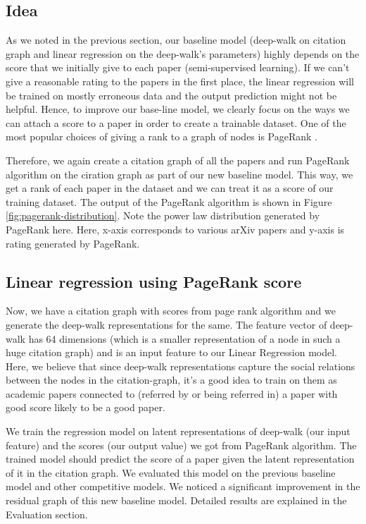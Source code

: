 \documentclass[a4paper, 11pt]{article}
\begin{document}
\subsection{Idea}
As we noted in the previous section, our baseline model (deep-walk on citation graph and linear regression on the deep-walk's parameters) highly depends on the score that we initially give to each paper (semi-supervised learning). If we can't give a reasonable rating to the papers in the first place, the linear regression will be trained on mostly erroneous data and the output prediction might not be helpful. Hence, to improve our base-line model, we clearly focus on the ways we can attach a score to a paper in order to create a trainable dataset. One of the most popular choices of giving a rank to a graph of nodes is PageRank \cite{pagerank}.

\vspace{0.5cm}

Therefore, we again create a citation graph of all the papers and run PageRank algorithm on the ciration graph as part of our new baseline model. This way, we get a rank of each paper in the dataset and we can treat it as a score of our training dataset. The output of the PageRank algorithm is shown in Figure \ref{fig:pagerank-distribution}. Note the power law distribution generated by PageRank here. Here, x-axis corresponds to various arXiv papers and y-axis is rating generated by PageRank.

\subsection{Linear regression using PageRank score}

Now, we have a citation graph with scores from page rank algorithm and we generate the deep-walk representations for the same. The feature vector of deep-walk has 64 dimensions (which is a smaller representation of a node in such a huge citation graph) and is an input feature to our Linear Regression model. Here, we believe that since deep-walk representations capture the social relations between the nodes in the citation-graph, it's a good idea to train on them as academic papers connected to (referred by or being referred in) a paper with good score likely to be a good paper. 

\vspace{0.5cm}

We train the regression model on latent representations of deep-walk (our input feature) and the scores (our output value) we got from PageRank algorithm. The trained model should predict the score of a paper given the latent representation of it in the citation graph. We evaluated this model on the previous baseline model and other competitive models. We noticed a significant improvement in the residual graph of this new baseline model. Detailed results are explained in the Evaluation section.
\end{document}

